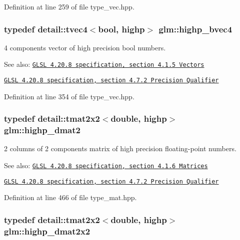 Definition at line 259 of file type\_\-vec.hpp.\hypertarget{group__core__precision_g381539af52c5e5c659700e12fb706eaf}{
\subsubsection[highp\_\-bvec4]{\setlength{\rightskip}{0pt plus 5cm}typedef detail::tvec4$<$bool, highp$>$ {\bf glm::highp\_\-bvec4}}}
\label{group__core__precision_g381539af52c5e5c659700e12fb706eaf}


4 components vector of high precision bool numbers.

\begin{Desc}
\item[See also:]\href{http://www.opengl.org/registry/doc/GLSLangSpec.4.20.8.pdf}{\tt GLSL 4.20.8 specification, section 4.1.5 Vectors} 

\href{http://www.opengl.org/registry/doc/GLSLangSpec.4.20.8.pdf}{\tt GLSL 4.20.8 specification, section 4.7.2 Precision Qualifier} \end{Desc}


Definition at line 354 of file type\_\-vec.hpp.\hypertarget{group__core__precision_g9b158b3b722fe991bb66f7e65f136e68}{
\subsubsection[highp\_\-dmat2]{\setlength{\rightskip}{0pt plus 5cm}typedef detail::tmat2x2$<$double, highp$>$ {\bf glm::highp\_\-dmat2}}}
\label{group__core__precision_g9b158b3b722fe991bb66f7e65f136e68}


2 columns of 2 components matrix of high precision floating-point numbers.

\begin{Desc}
\item[See also:]\href{http://www.opengl.org/registry/doc/GLSLangSpec.4.20.8.pdf}{\tt GLSL 4.20.8 specification, section 4.1.6 Matrices} 

\href{http://www.opengl.org/registry/doc/GLSLangSpec.4.20.8.pdf}{\tt GLSL 4.20.8 specification, section 4.7.2 Precision Qualifier} \end{Desc}


Definition at line 466 of file type\_\-mat.hpp.\hypertarget{group__core__precision_ga5e35f6570d394c1cd34f411a473220c}{
\subsubsection[highp\_\-dmat2x2]{\setlength{\rightskip}{0pt plus 5cm}typedef detail::tmat2x2$<$double, highp$>$ {\bf glm::highp\_\-dmat2x2}}}
\label{group__core__precision_ga5e35f6570d394c1cd34f411a473220c}


